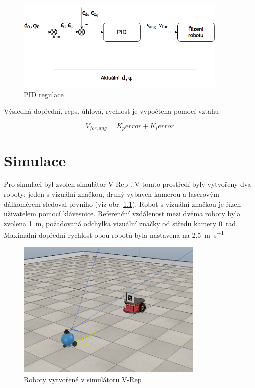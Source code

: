 \documentclass[twoside]{ctuthesis}
\theoremstyle{plain}
\theoremstyle{definition}
\theoremstyle{note}
\begin{document}
\begin{figure}[H]
	\caption{PID regulace}

	\label{pid}
	\includegraphics[width=0.9\textwidth, height = 0.4\textwidth]{images/3/PID.png}
\end{figure}


Výsledná dopřední, reps. úhlová, rychlost je vypočtena pomocí vztahu 

\begin{equation}
V_{for, ang} = K_perror + K_ierror
\end{equation}
\chapter{Simulace}
\label{simulace}

Pro simulaci byl zvolen simulátor V-Rep \cite{cite:15}. V tomto prostředí byly vytvořeny dva roboty: jeden s vizuální značkou, druhý vybaven kamerou a laserovým dálkoměrem sledoval prvního (viz obr. \ref{robots}). Robot s vizuální značkou je řízen uživatelem pomocí klávesnice. Referenční vzdálenost mezi dvěma roboty byla zvolena \SI{1}{\meter}, požadovaná odchylka vizuální značky od středu kamery \SI{0}{\radian}. Maximální dopřední rychlost obou robotů byla nastavena na \SI{2.5}{\meter\per\second}

\begin{figure}
	\caption{Roboty vytvořené v simulátoru V-Rep}

	\label{robots}
	\includegraphics[width=0.8\textwidth]{images/5/robots.png}
\end{figure}
\end{document}
